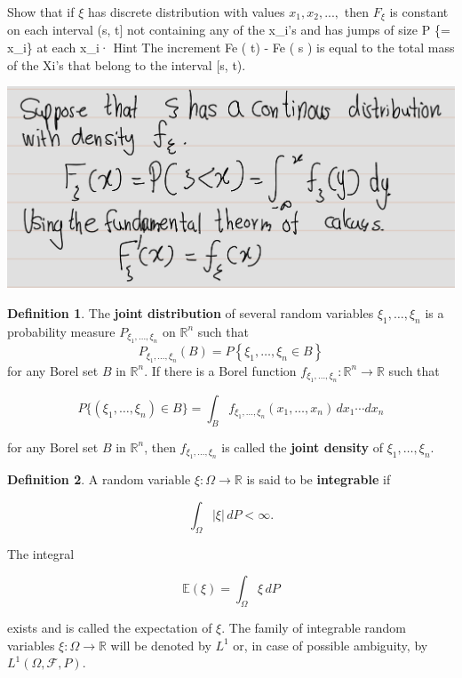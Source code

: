 \documentclass[
]{book}
\theoremstyle{definition}
\newtheorem{definition}{Definition}[chapter]
\theoremstyle{definition}
\theoremstyle{definition}
\theoremstyle{definition}
\theoremstyle{remark}
\begin{document}
Show that if \(\xi\) has discrete distribution with values \(x_1, x_2, . . . ,\) then \(F_\xi\) is
constant on each interval (s, t{]} not containing any of the x\_i's and has jumps of size P \{\xi= x\_i\} at each x\_i·
Hint The increment Fe ( t) - Fe ( s ) is equal to the total mass of the Xi's that belong to the interval {[}s, t).

\includegraphics[width=18cm,height=\textheight]{fig/fig ex1.5.png}

\begin{definition}
\protect\hypertarget{def:unnamed-chunk-24}{}\label{def:unnamed-chunk-24}The \textbf{joint distribution} of several random variables \(\xi_1, \ldots, \xi_n\) is a probability measure \(P_{\xi_1, \ldots, \xi_n}\) on \(\mathbb{R}^n\) such that
\[P_{\xi_1, \ldots, \xi_n}(B)=P\left\{\xi_1, \ldots, \xi_n\in B\right\}\]
for any Borel set \(B\) in \(\mathbb{R}^n\). If there is a Borel function \(f_{\xi_1, \ldots, \xi_n} : \mathbb{R}^n \to \mathbb{R}\) such that

\[ P\{(\xi_1, \ldots, \xi_n) \in B\} = \int_B f_{\xi_1, \ldots, \xi_n}(x_1, \ldots, x_n) \, dx_1 \cdots dx_n \]

for any Borel set \(B\) in \(\mathbb{R}^n\), then \(f_{\xi_1, \ldots, \xi_n}\) is called the \textbf{joint density} of \(\xi_1, \ldots, \xi_n\).
\end{definition}

\begin{definition}
\protect\hypertarget{def:unnamed-chunk-25}{}\label{def:unnamed-chunk-25}A random variable \(\xi : \Omega \to \mathbb{R}\) is said to be \textbf{integrable} if

\[ \int_\Omega |\xi| \, dP < \infty. \]

The integral

\[ \mathbb{E}(\xi) = \int_\Omega \xi \, dP \]

exists and is called the expectation of \(\xi\). The family of integrable random variables \(\xi : \Omega \to \mathbb{R}\) will be denoted by \(L^1\) or, in case of possible ambiguity, by \(L^1(\Omega, \mathcal{F}, P)\).
\end{definition}
\end{document}

